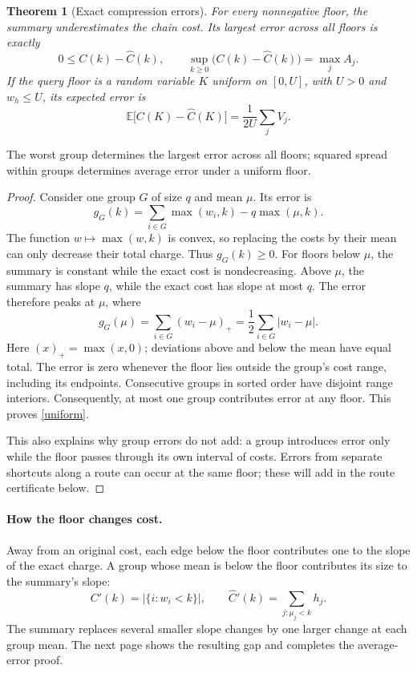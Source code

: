 \documentclass[11pt]{article}
\newtheorem{theorem}{Theorem}
\begin{document}
\begin{theorem}[Exact compression errors]\label{thm:error}
For every nonnegative floor, the summary underestimates the chain cost.
Its largest error across all floors is exactly
\begin{equation}\label{uniform}
 0\le C(k)-\widehat C(k),\qquad
 \sup_{k\ge0}\bigl(C(k)-\widehat C(k)\bigr)=\max_j A_j.
\end{equation}
If the query floor is a random variable $K$ uniform on $[0,U]$, with
$U>0$ and $w_h\le U$, its expected error is
\begin{equation}\label{average}
 \mathbb E\bigl[C(K)-\widehat C(K)\bigr]=\frac{1}{2U}\sum_j V_j.
\end{equation}
\end{theorem}
\begin{takeaway}
The worst group determines the largest error across all floors; squared
spread within groups determines average error under a uniform floor.
\end{takeaway}
\begin{proof}
Consider one group $G$ of size $q$ and mean $\mu$. Its error is
\[
 g_G(k)=\sum_{i\in G}\max(w_i,k)-q\max(\mu,k).
\]
The function $w\mapsto\max(w,k)$ is convex, so replacing the costs by their
mean can only decrease their total charge. Thus $g_G(k)\ge0$.
For floors below $\mu$, the summary is constant while the exact cost is
nondecreasing. Above $\mu$, the summary has slope $q$, while the exact
cost has slope at most $q$. The error therefore peaks at $\mu$, where
\[
 g_G(\mu)=\sum_{i\in G}(w_i-\mu)_+
 =\frac12\sum_{i\in G}|w_i-\mu|.
\]
Here $(x)_+=\max(x,0)$; deviations above and below the mean have equal total.
The error is zero whenever the floor lies outside the group's cost range,
including its endpoints. Consecutive groups in sorted order have disjoint
range interiors. Consequently, at most one group contributes error at any
floor. This proves \eqref{uniform}.

This also explains why group errors do not add: a group introduces error
only while the floor passes through its own interval of costs. Errors
from separate shortcuts along a route can occur at the same floor; these
will add in the route certificate below.
\end{proof}

\paragraph{How the floor changes cost.}
Away from an original cost, each edge below the floor contributes one
to the slope of the exact charge. A group whose mean is below the floor
contributes its size to the summary's slope:
\[
 C'(k)=|\{i:w_i<k\}|,\qquad
 \widehat C'(k)=\sum_{j:\mu_j<k}h_j.
\]
The summary replaces several smaller slope changes by one larger change
at each group mean. The next page shows the resulting gap and completes
the average-error proof.
\end{document}
